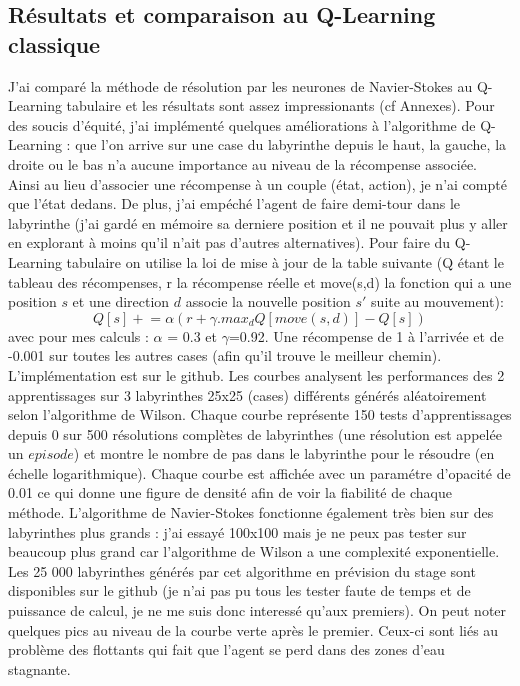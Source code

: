 \documentclass[10pt]{article}
\newcommand{\pluseq}{\mathrel{+}=}
\begin{document}
\subsection{Résultats et comparaison au Q-Learning classique}
J'ai comparé la méthode de résolution par les neurones de Navier-Stokes au Q-Learning tabulaire et les résultats sont assez impressionants (cf Annexes). Pour des soucis d'équité, j'ai implémenté quelques améliorations à l'algorithme de Q-Learning : que l'on arrive sur une case du labyrinthe depuis le haut, la gauche, la droite ou le bas n'a aucune importance au niveau de la récompense associée. Ainsi au lieu d'associer une récompense à un couple (état, action), je n'ai compté que l'état dedans. De plus, j'ai empéché l'agent de faire demi-tour dans le labyrinthe (j'ai gardé en mémoire sa derniere position et il ne pouvait plus y aller en explorant à moins qu'il n'ait pas d'autres alternatives). Pour faire du Q-Learning tabulaire on utilise la loi de mise à jour de la table suivante (Q étant le tableau des récompenses, r la récompense réelle et move(s,d) la fonction qui a une position $s$ et une direction $d$ associe la nouvelle position $s'$ suite au mouvement):
\[Q[s] \pluseq \alpha(r+\gamma.max_dQ[move(s,d)]-Q[s])\]
avec pour mes calculs : $\alpha$ = 0.3 et $\gamma$=0.92. Une récompense de 1 à l'arrivée et de -0.001 sur toutes les autres cases (afin qu'il trouve le meilleur chemin). L'implémentation est sur le github.
Les courbes analysent les performances des 2 apprentissages sur 3 labyrinthes 25x25 (cases) différents générés aléatoirement selon l'algorithme de Wilson. Chaque courbe représente 150 tests d'apprentissages depuis 0 sur 500 résolutions complètes de labyrinthes (une résolution est appelée un $\textit{episode}$) et montre le nombre de pas dans le labyrinthe pour le résoudre (en échelle logarithmique). Chaque courbe est affichée avec un paramétre d'opacité de 0.01 ce qui donne une figure de densité afin de voir la fiabilité de chaque méthode.
L'algorithme de Navier-Stokes fonctionne également très bien sur des labyrinthes plus grands : j'ai essayé 100x100 mais je ne peux pas tester sur beaucoup plus grand car l'algorithme de Wilson a une complexité exponentielle. Les 25 000 labyrinthes générés par cet algorithme en prévision du stage sont disponibles sur le github (je n'ai pas pu tous les tester faute de temps et de puissance de calcul, je ne me suis donc interessé qu'aux premiers).
On peut noter quelques pics au niveau de la courbe verte après le premier. Ceux-ci sont liés au problème des flottants qui fait que l'agent se perd dans des zones d'eau stagnante.
\end{document}
